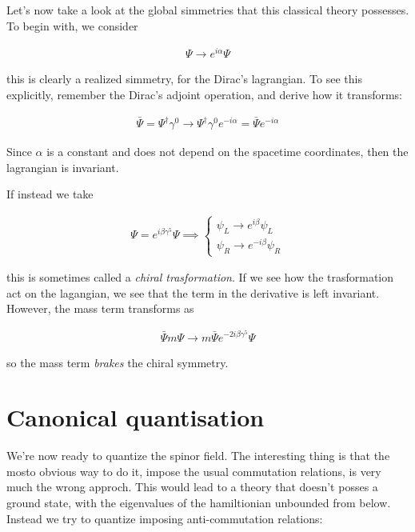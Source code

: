 \documentclass{report}
\begin{document}
Let's now take a look at the global simmetries that this classical theory possesses. To begin with, we consider 

\begin{align}
    \Psi \rightarrow e^{i\alpha}\Psi
\end{align}

this is clearly a realized simmetry, for the Dirac's lagrangian. To see this explicitly, remember the Dirac's adjoint operation, and derive how it transforms: 

\begin{align}
    \bar{\Psi} = \Psi^\dagger \gamma^0 \rightarrow \Psi^\dagger\gamma^0 e^{-i\alpha} = \bar{\Psi}e^{-i\alpha}
\end{align}

Since \(\alpha\) is a constant and does not depend on the spacetime coordinates, then the lagrangian is invariant. 

If instead we take 

\begin{align}
    \Psi = e^{i\beta\gamma^5}\Psi \implies \begin{cases}
        \psi_L \rightarrow e^{i\beta}\psi_L \\
        \psi_R \rightarrow e^{-i\beta}\psi_R
    \end{cases}
\end{align}
 
this is sometimes called a \emph{chiral trasformation}. If we see how the trasformation act on the lagangian, we see that the term in the derivative is left invariant. However, the mass term transforms as 

\begin{align}
    \bar{\Psi}m\Psi \rightarrow m\bar{\Psi}e^{-2i\beta\gamma^5}\Psi
\end{align}

so the mass term \emph{brakes} the chiral symmetry. 

\section{Canonical quantisation}

We're now ready to quantize the spinor field. The interesting thing is that the mosto obvious way to do it, impose the usual commutation relations, is very much the wrong approch. This would lead to a theory that doesn't posses a ground state, with the eigenvalues of the hamiltionian unbounded from below. Instead we try to quantize imposing anti-commutation relations: 
\end{document}
